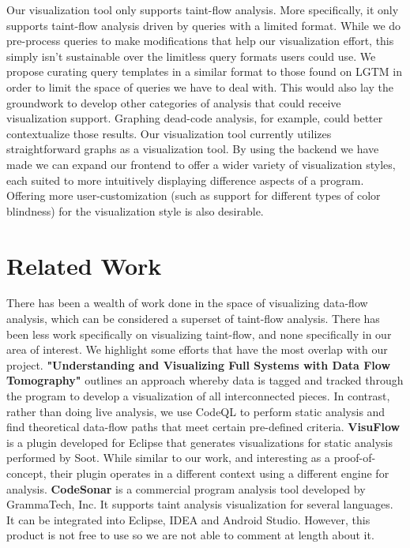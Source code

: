 \documentclass[sigplan,10pt,review]{acmart}
\begin{document}
\indent Our visualization tool only supports taint-flow analysis. More specifically, it only supports taint-flow analysis driven by queries with a limited format. While we do pre-process queries to make modifications that help our visualization effort, this simply isn't sustainable over the limitless query formats users could use. We propose curating query templates in a similar format to those found on LGTM in order to limit the space of queries we have to deal with. This would also lay the groundwork to develop other categories of analysis that could receive visualization support. Graphing dead-code analysis, for example, could better contextualize those results.
\newline
\indent Our visualization tool currently utilizes straightforward graphs as a visualization tool. By using the backend we have made we can expand our frontend to offer a wider variety of visualization styles, each suited to more intuitively displaying difference aspects of a program. Offering more user-customization (such as support for different types of color blindness) for the visualization style is also desirable.

\section{Related Work}
There has been a wealth of work done in the space of visualizing data-flow analysis, which can be considered a superset of taint-flow analysis. There has been less work specifically on visualizing taint-flow, and none specifically in our area of interest. We highlight some efforts that have the most overlap with our project.
\newline\newline
\indent \textbf{"Understanding and Visualizing Full Systems with Data Flow Tomography"} \cite{10.1145/1353535.1346308} outlines an approach whereby data is tagged and tracked through the program to develop a visualization of all interconnected pieces. In contrast, rather than doing live analysis, we use CodeQL to perform static analysis and find theoretical data-flow paths that meet certain pre-defined criteria.
\newline\newline
\indent \textbf {VisuFlow} \cite{10.1145/3183440.3183470} is a plugin developed for Eclipse that generates visualizations for static analysis performed by Soot. While similar to our work, and interesting as a proof-of-concept, their plugin operates in a different context using a different engine for analysis.
\newline\newline
\indent \textbf {CodeSonar} is a commercial program analysis tool developed by GrammaTech, Inc. It supports taint analysis visualization for several languages. It can be integrated into Eclipse, IDEA and Android Studio. However, this product is not free to use so we are not able to comment at length about it.
\end{document}
